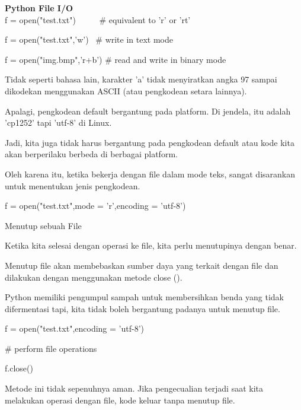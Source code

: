 \begin{center}{\fontsize{24pt}{24pt}\selectfont \textbf{Python File I/O} \\}
f = open("test.txt")~~~~~  $  \#  $ equivalent to 'r' or 'rt' 

f = open("test.txt",'w')~  $  \#  $ write in text mode 

f = open("img.bmp",'r+b')  $  \#  $ read and write in binary mode 
\vspace{12pt}

Tidak seperti bahasa lain, karakter 'a' tidak menyiratkan angka 97 sampai dikodekan menggunakan ASCII (atau pengkodean setara lainnya). 
\vspace{12pt}

Apalagi, pengkodean default bergantung pada platform. Di jendela, itu adalah 'cp1252' tapi 'utf-8' di Linux. 
\vspace{12pt}

Jadi, kita juga tidak harus bergantung pada pengkodean default atau kode kita akan berperilaku berbeda di berbagai platform. 

\vspace{12pt}
 
Oleh karena itu, ketika bekerja dengan file dalam mode teks, sangat disarankan untuk menentukan jenis pengkodean. 
\vspace{12pt}

f = open("test.txt",mode = 'r',encoding = 'utf-8') 
\vspace{12pt}
 
Menutup sebuah File 
\vspace{12pt}

Ketika kita selesai dengan operasi ke file, kita perlu menutupinya dengan benar. 
\vspace{12pt}
 
Menutup file akan membebaskan sumber daya yang terkait dengan file dan dilakukan dengan menggunakan metode close (). 
\vspace{12pt}

Python memiliki pengumpul sampah untuk membersihkan benda yang tidak difermentasi tapi, kita tidak boleh bergantung padanya untuk menutup file. 

f = open("test.txt",encoding = 'utf-8') 

 $  \#  $ perform file operations 
 
f.close() 
\vspace{16pt}
 
Metode ini tidak sepenuhnya aman. Jika pengecualian terjadi saat kita melakukan operasi dengan file, kode keluar tanpa menutup file. 
\vspace{12pt}


\end{center}
